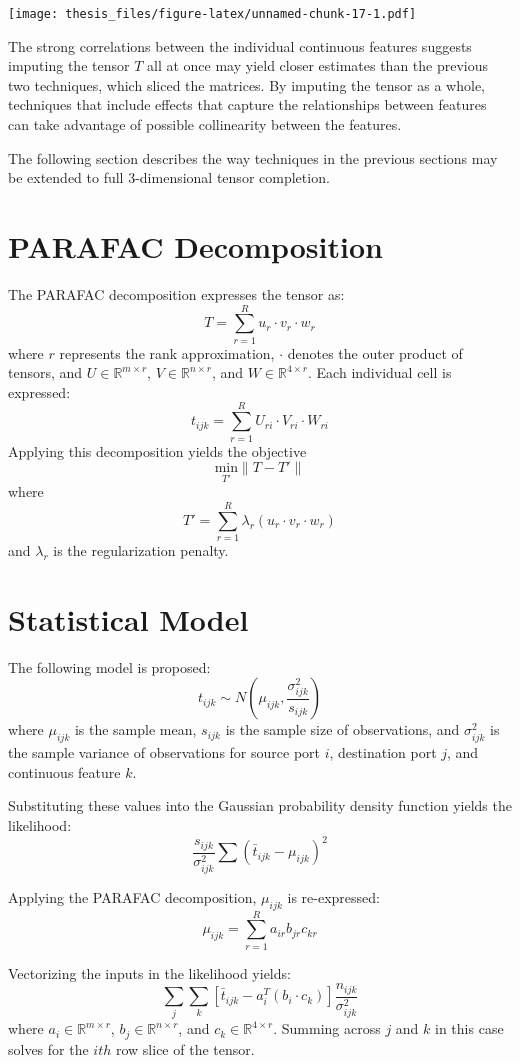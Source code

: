 \documentclass[12pt,twoside]{dukestatscithesis}
\theoremstyle{definition}
\theoremstyle{definition}
\theoremstyle{definition}
\theoremstyle{remark}
\begin{document}
\texttt{[image: thesis\_files/figure-latex/unnamed-chunk-17-1.pdf]}

The strong correlations between the individual continuous features
suggests imputing the tensor \(T\) all at once may yield closer
estimates than the previous two techniques, which sliced the matrices.
By imputing the tensor as a whole, techniques that include effects that
capture the relationships between features can take advantage of
possible collinearity between the features.

The following section describes the way techniques in the previous
sections may be extended to full 3-dimensional tensor completion.

\section{PARAFAC Decomposition}\label{parafac-decomposition}

The PARAFAC decomposition expresses the tensor as:
\[T = \sum_{r=1}^Ru_r \cdotp v_r \cdotp w_r\] where \(r\) represents the
rank approximation, \(\cdotp\) denotes the outer product of tensors, and
\(U \in \mathbb{R}^{m \times r}\), \(V \in \mathbb{R}^{n \times r}\),
and \(W \in \mathbb{R}^{4 \times r}\). Each individual cell is
expressed: \[t_{ijk} = \sum_{r=1}^RU_{ri} \cdotp V_{ri} \cdotp W_{ri}\]
Applying this decomposition yields the objective
\[\underset{T'} {\text{min}}\|T-T'\|\] where
\[T' = \sum_{r=1}^R\lambda_r(u_r \cdotp v_r \cdotp w_r)\] and
\(\lambda_r\) is the regularization penalty.

\section{Statistical Model}\label{statistical-model}

The following model is proposed:
\[t_{ijk} \sim N(\mu_{ijk}, \frac{\sigma^2_{ijk}}{s_{ijk}})\] where
\(\mu_{ijk}\) is the sample mean, \(s_{ijk}\) is the sample size of
observations, and \(\sigma^2_{ijk}\) is the sample variance of
observations for source port \(i\), destination port \(j\), and
continuous feature \(k\).

Substituting these values into the Gaussian probability density function
yields the likelihood:
\[\frac{s_{ijk}}{\sigma^2_{ijk}}\sum(\bar t_{ijk} - \mu_{ijk})^2\]

Applying the PARAFAC decomposition, \(\mu_{ijk}\) is re-expressed:
\[\mu_{ijk} = \sum_{r=1}^Ra_{ir}b_{jr}c_{kr}\]

Vectorizing the inputs in the likelihood yields:
\[\sum_j\sum_k[\bar t_{ijk} - a_i^T(b_i \cdotp c_k)]\frac{n_{ijk}}{\sigma^2_{ijk}}\]
where \(a_i \in \mathbb{R}^{m \times r}\),
\(b_j \in \mathbb{R}^{n \times r}\), and
\(c_k \in \mathbb{R}^{4 \times r}\). Summing across \(j\) and \(k\) in
this case solves for the \(ith\) row slice of the tensor.
\end{document}

